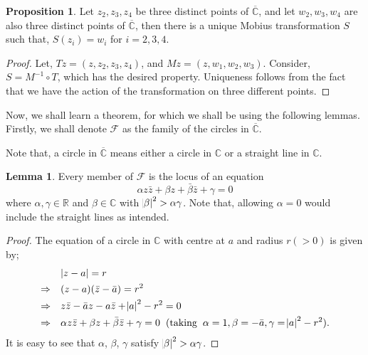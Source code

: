 \documentclass[12pt]{article}
\newcommand{\R}{\mathbb{R}}
\newcommand{\C}{\mathbb{C}}
\newcommand{\Cinf}{\overline{\C}}
\theoremstyle{definition}
\newtheorem{lem}{Lemma}
\newtheorem{prop}{Proposition}
\newenvironment{lemma}{
\begin{tcolorbox}[colback=green!5!white,colframe=green!75!black, parbox = false]\begin{lem} }{\end{lem}\end{tcolorbox} }
\newenvironment{proposition}{
\begin{tcolorbox}[colback=green!5!white,colframe=green!75!black, parbox = false]\begin{prop} }{\end{prop}\end{tcolorbox} }
\newenvironment{note}{
\begin{tcolorbox}[colback=blue!5!white,colframe=blue!75!black,title=Note, parbox = false] }{\end{tcolorbox} }
\begin{document}
\begin{proposition}
    \label{prop3}
    Let $z_2, z_3, z_4$ be three distinct points of $\Cinf$, and let $w_2, w_3, w_4$ are also three distinct points of $\Cinf$, then there is a unique Mobius transformation $S$ such that, $S(z_i) = w_i$ for $i = 2, 3, 4$.
\end{proposition}
\begin{proof}
    Let, $Tz = (z, z_2, z_3, z_4)$, and $Mz = (z, w_1, w_2, w_3)$.
    Consider, $S = M^{-1}\circ T$, which has the desired property. 
    Uniqueness follows from the fact that we have the action of the transformation on three different points.
\end{proof}


Now, we shall learn a theorem, for which we shall be using the following lemmas. Firstly, we shall denote $\mathcal{F}$ as the family of the circles in $\Cinf$.

\begin{note}
        Note that, a circle in $\Cinf$ means either a circle in $\C$ or a straight line in $\C$.
\end{note}

\begin{lemma}
    Every member of $\mathcal{F}$ is the locus of an equation 
    $$\alpha z \bar{z} + \beta z + \bar{\beta}\bar{z} + \gamma = 0$$
    where $\alpha, \gamma \in \R$ and $\beta \in \C$ with $\abs{\beta}^2 > \alpha \gamma$. Note that, allowing $\alpha = 0$ would include the straight lines as intended.
    \label{lemma:eqn-circle-cbar}
\end{lemma}

\begin{proof}
    The equation of a circle in $\C$ with centre at $a$ and radius $r (> 0)$ is given by;
    \begin{align*}
    & \quad \abs{z - a}=r\\
    \Rightarrow &\quad (z-a)(\bar{z}-\bar{a})=r^2\\
    \Rightarrow &\quad z\bar{z}-\bar{a}z-a\bar{z}+{\abs{a}}^2-r^2=0\\
    \Rightarrow &\quad \alpha z\bar{z}+ \beta z + \bar{\beta}\bar{z} + \gamma = 0 \hspace{2mm} (\text{taking} \hspace{2mm} \alpha=1, \beta= -\bar{a}, \gamma= {\abs{a}}^2-r^2).
    \end{align*}
    It is easy to see that $\alpha$, $\beta$, $\gamma$ satisfy $\abs{\beta}^2 > \alpha \gamma$.
\end{proof}
\end{document}
